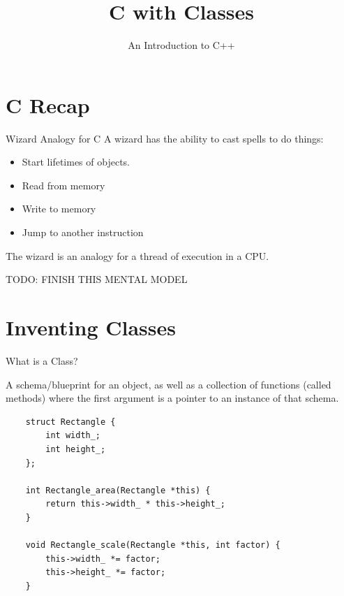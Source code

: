 

\title{C with Classes}
\subtitle{An Introduction to C++}
\date{}



\maketitle

\section{C Recap}

\begin{frame}[fragile]{Wizard Analogy for C}
  A wizard has the ability to cast spells to do things:
  \begin{itemize}
    \item Start lifetimes of objects.
    \item Read from memory
    \item Write to memory
    \item Jump to another instruction
  \end{itemize}

  \begin{sqt:tip}
    The wizard is an analogy for a thread of execution in a CPU.
  \end{sqt:tip}

  TODO: FINISH THIS MENTAL MODEL
\end{frame}

\section{Inventing Classes}

\begin{frame}[fragile]{What is a Class?}
  \begin{sqt:definition}
    A schema/blueprint for an object, as well as a collection of functions
    (called methods) where the first argument is a pointer to an instance of that schema.
  \end{sqt:definition}

  \begin{verbatim}
    struct Rectangle {
        int width_;
        int height_; 
    };

    int Rectangle_area(Rectangle *this) {
        return this->width_ * this->height_;
    }

    void Rectangle_scale(Rectangle *this, int factor) {
        this->width_ *= factor;
        this->height_ *= factor;
    }
  \end{verbatim}
\end{frame}

